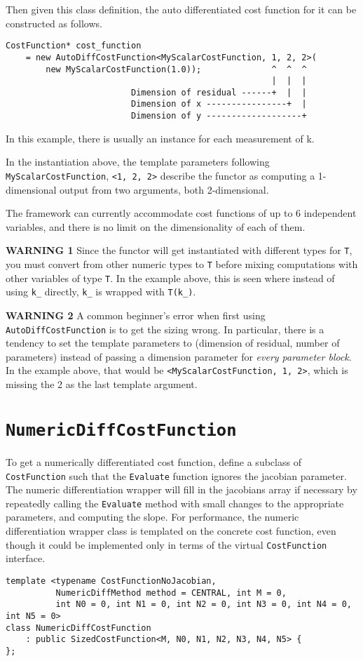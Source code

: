  Then given this class definition, the auto differentiated cost function for
 it can be constructed as follows.

\begin{verbatim}
CostFunction* cost_function
    = new AutoDiffCostFunction<MyScalarCostFunction, 1, 2, 2>(
        new MyScalarCostFunction(1.0));              ^  ^  ^
                                                     |  |  |
                         Dimension of residual ------+  |  |
                         Dimension of x ----------------+  |
                         Dimension of y -------------------+
\end{verbatim}

In this example, there is usually an instance for each measurement of k.

In the instantiation above, the template parameters following
 \texttt{MyScalarCostFunction}, \texttt{<1, 2, 2>} describe the functor as computing a
 1-dimensional output from two arguments, both 2-dimensional.

 The framework can currently accommodate cost functions of up to 6 independent
 variables, and there is no limit on the dimensionality of each of them.

 \textbf{WARNING 1} Since the functor will get instantiated with different types for
 \texttt{T}, you must convert from other numeric types to \texttt{T} before mixing
 computations with other variables of type \texttt{T}. In the example above, this is
 seen where instead of using \texttt{k\_} directly, \texttt{k\_} is wrapped with \texttt{T(k\_)}.

 \textbf{WARNING 2} A common beginner's error when first using \texttt{AutoDiffCostFunction} is to get the sizing wrong. In particular, there is a tendency to
 set the template parameters to (dimension of residual, number of parameters)
 instead of passing a dimension parameter for {\em every parameter block}. In the
 example above, that would be \texttt{<MyScalarCostFunction, 1, 2>}, which is missing
 the 2 as the last template argument. 

\section{\texttt{NumericDiffCostFunction}}
To get a numerically differentiated cost function, define a subclass of
\texttt{CostFunction} such that the \texttt{Evaluate} function ignores the jacobian
parameter. The numeric differentiation wrapper will fill in the jacobians array
 if necessary by repeatedly calling the \texttt{Evaluate} method with
small changes to the appropriate parameters, and computing the slope. For
performance, the numeric differentiation wrapper class is templated on the
concrete cost function, even though it could be implemented only in terms of
the virtual \texttt{CostFunction} interface.
\begin{verbatim}
template <typename CostFunctionNoJacobian,
          NumericDiffMethod method = CENTRAL, int M = 0,
          int N0 = 0, int N1 = 0, int N2 = 0, int N3 = 0, int N4 = 0, int N5 = 0>
class NumericDiffCostFunction
    : public SizedCostFunction<M, N0, N1, N2, N3, N4, N5> {
};
\end{verbatim}


